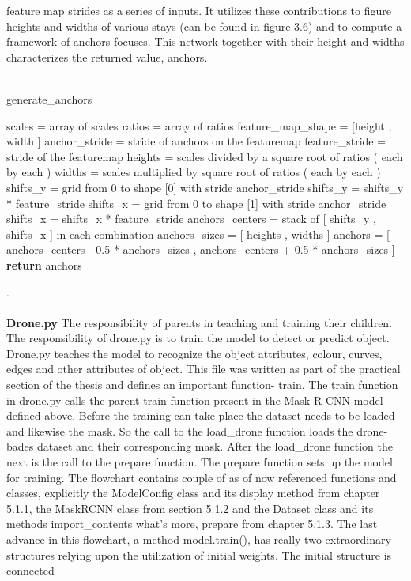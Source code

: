 feature map strides as a series of inputs. It utilizes these contributions to figure heights and widths of various stays (can be found in figure 3.6) and to compute a framework of anchors
focuses. This network together with their height and widths characterizes the returned value, anchors.
\\
\\
\begin{algorithm}[H]
  \caption{generate\_anchors}
  \SetAlgoLined
  \DontPrintSemicolon
  scales = array of scales\;
ratios = array of ratios\;
feature\_map\_shape = [height , width ]\;
anchor\_stride = stride of anchors on the featuremap\;
feature\_stride = stride of the featuremap\;
 heights = scales divided by a square root of ratios ( each by each )\;
 widths = scales multiplied by square root of ratios ( each by each )\;
 shifts\_y = grid from 0 to shape [0] with stride anchor\_stride\;
 shifts\_y = shifts\_y * feature\_stride\;
 shifts\_x = grid from 0 to shape [1] with stride anchor\_stride\;
 shifts\_x = shifts\_x * feature\_stride\;
 anchors\_centers = stack of [ shifts\_y , shifts\_x ] in each combination\;
anchors\_sizes = [ heights , widths ]\;
anchors = [ anchors\_centers - 0.5 * anchors\_sizes , anchors\_centers + 0.5 * anchors\_sizes ]\;
\textbf{return} anchors
\end{algorithm}
.\\
\\
\textbf{Drone.py}
The responsibility of parents in teaching and training their children. The responsibility of drone.py is to train the model to detect or 
predict object. Drone.py teaches the model to recognize the object attributes, colour, curves, edges and other attributes of object. 
This file was written as part of the practical section of the thesis and defines an important function- train. 
The train function in drone.py calls the parent train function present in the Mask R-CNN model defined above.  Before the training can take place the dataset needs to be loaded and likewise the mask. So the call to the load\_drone function loads the drone-bades dataset and their corresponding mask.   
After the load\_drone function the next is the call to the prepare function. The prepare function sets up the model for training.
The flowchart contains couple of as of now referenced functions and classes, explicitly the ModelConfig class and its display method from chapter 5.1.1, the MaskRCNN 
class from section 5.1.2 and the Dataset class and its methods import\_contents what's more, prepare from chapter 5.1.3. 
The last advance in this flowchart, a method model.train(), has really two extraordinary structures relying upon the utilization of initial weights. The initial structure is connected 
